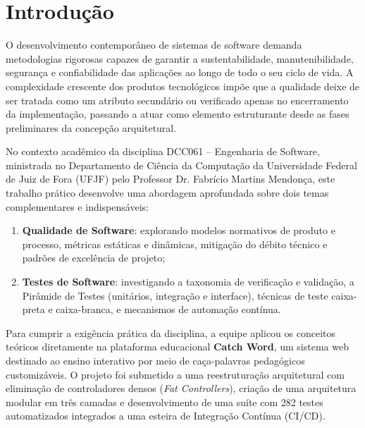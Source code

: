 \documentclass[12pt,a4paper]{article}
\begin{document}
\newpage
\setcounter{page}{1}

\section{Introdução}

O desenvolvimento contemporâneo de sistemas de software demanda metodologias rigorosas capazes de garantir a sustentabilidade, manutenibilidade, segurança e confiabilidade das aplicações ao longo de todo o seu ciclo de vida. A complexidade crescente dos produtos tecnológicos impõe que a qualidade deixe de ser tratada como um atributo secundário ou verificado apenas no encerramento da implementação, passando a atuar como elemento estruturante desde as fases preliminares da concepção arquitetural.

No contexto acadêmico da disciplina DCC061 -- Engenharia de Software, ministrada no Departamento de Ciência da Computação da Universidade Federal de Juiz de Fora (UFJF) pelo Professor Dr. Fabrício Martins Mendonça, este trabalho prático desenvolve uma abordagem aprofundada sobre dois temas complementares e indispensáveis:
\begin{enumerate}
    \item \textbf{Qualidade de Software}: explorando modelos normativos de produto e processo, métricas estáticas e dinâmicas, mitigação do débito técnico e padrões de excelência de projeto;
    \item \textbf{Testes de Software}: investigando a taxonomia de verificação e validação, a Pirâmide de Testes (unitários, integração e interface), técnicas de teste caixa-preta e caixa-branca, e mecanismos de automação contínua.
\end{enumerate}

Para cumprir a exigência prática da disciplina, a equipe aplicou os conceitos teóricos diretamente na plataforma educacional \textbf{Catch Word}, um sistema web destinado ao ensino interativo por meio de caça-palavras pedagógicos customizáveis. O projeto foi submetido a uma reestruturação arquitetural com eliminação de controladores densos (\textit{Fat Controllers}), criação de uma arquitetura modular em três camadas e desenvolvimento de uma suíte com 282 testes automatizados integrados a uma esteira de Integração Contínua (CI/CD).
\end{document}
